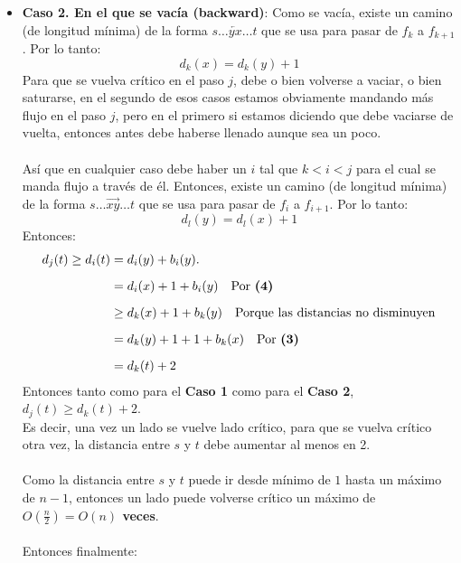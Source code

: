 \documentclass[11pt, a4paper]{article}
\theoremstyle{definition}
\begin{document}
\begin{itemize}
        \item \textbf{Caso 2. En el que se vacía (backward)}: Como se vacía, existe un camino (de longitud mínima) de la forma 
                $s \ldots \overleftarrow{yx} \ldots t$ que se usa para pasar de $f_k$ a $f_{k+1}$. Por lo tanto:
                \[
                    d_k(x)=d_k(y)+1 \tag{3}
                \]
                Para que se vuelva crítico en el paso $j$, debe o bien volverse a vaciar, o bien saturarse, en el segundo de esos casos estamos 
                obviamente mandando más flujo en el paso $j$, pero en el primero si estamos diciendo que debe vaciarse de vuelta, entonces antes 
                debe haberse llenado aunque sea un poco. \\ \\ 
                Así que en cualquier caso debe haber un $i$ tal que $k<i<j$ para el cual se manda flujo a través de él. Entonces, existe un camino 
                (de longitud mínima) de la forma $s \ldots \overrightarrow{xy} \ldots t$ que se usa para pasar de $f_i$ a $f_{i+1}$. Por lo tanto:
                \[
                    d_l(y)=d_l(x)+1 \tag{4}
                \]
                Entonces:
                \begin{align*}
                    d_j(t) \geq d_i(t) &= d_i(y) + b_i(y). \\[6pt]
                    &= d_i(x) + 1 + b_i(y) \quad \text{Por \textbf{(4)}} \\[6pt]
                    &\geq d_k(x) + 1 + b_k(y) \quad \text{Porque las distancias no disminuyen} \\[6pt]
                    &= d_k(y) + 1 + 1 + b_k(x) \quad \text{Por \textbf{(3)}} \\[6pt]
                    &= d_k(t) + 2
                    \end{align*}
                Entonces tanto como para el \textbf{Caso 1} como para el \textbf{Caso 2}, $d_j(t) \geq d_k(t)+2$.\\
                Es decir, una vez un lado se vuelve lado crítico, para que se vuelva 
                crítico otra vez, la distancia entre $s$ y $t$ debe aumentar al menos en 2.\\ \\
                Como la distancia entre $s$ y $t$ puede ir desde mínimo de $1$ hasta un máximo de $n-1$, entonces un lado puede volverse crítico 
                un máximo de \textbf{$O(\frac{n}{2}) = O(n)$ veces}.\\ \\
                Entonces finalmente:

\end{itemize}
\end{document}
